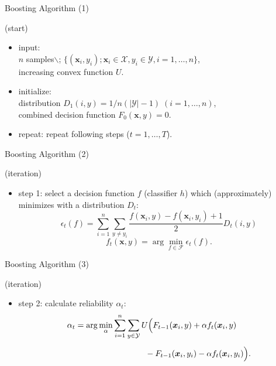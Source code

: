 \documentclass[fleqn,aspectratio=1610]{beamer}
\begin{document}
\begin{frame}[label={sec:org0817b00}]{Boosting Algorithm (1)}
\begin{block}{(start)}
\begin{itemize}
\item \alert{input:}\\[0pt]
\(n\) samples$\backslash$;
\(\{(\boldsymbol{x}_i,y_i); \boldsymbol{x}_i\in\mathcal{X},y_i\in\mathcal{Y}, i=1,\dots,n\}\),\\[0pt]
increasing convex function \(U\).
\item \alert{initialize:}\\[0pt]
distribution \(D_1(i,y)=1/n(|\mathcal{Y}|-1)\;(i=1,\dots,n)\),\\[0pt]
combined decision function \(F_0(\boldsymbol{x},y)=0\).
\item \alert{repeat:}
repeat following steps (\(t=1,\dots,T\)).
\end{itemize}
\end{block}
\end{frame}

\begin{frame}[label={sec:org96e89a5}]{Boosting Algorithm (2)}
\begin{block}{(iteration)}
\begin{itemize}
\item \alert{step 1:}
select a decision function \(f\) (classifier \(h\)) 
which (approximately) minimizes 
with a distribution \(D_t\):
\begin{equation}
  \epsilon_t(f) 
  =\sum_{i=1}^{n}\sum_{y\not=y_i}
  \frac{f(\boldsymbol{x}_i,y)-f(\boldsymbol{x}_i,y_i)+1}{2} D_t(i,y)
\end{equation}
\begin{equation}
  f_t(\boldsymbol{x},y)
  =\arg\min_{f\in\mathcal{F}}\epsilon_t(f).
\end{equation}
\end{itemize}
\end{block}
\end{frame}
\begin{frame}[label={sec:org6429079}]{Boosting Algorithm (3)}
\begin{block}{(iteration)}
\begin{itemize}
\item \alert{step 2:}
calculate reliability \(\alpha_t\):
\begin{align}
  \alpha_t 
  &=\arg\min_{\alpha}\sum_{i=1}^n\sum_{y\in\mathcal{Y}}
    U\Bigl(F_{t-1}(\boldsymbol{x}_i,y)
    +\alpha f_{t}(\boldsymbol{x}_i,y)\\
  &\phantom{\arg\min_{\alpha}\sum_{i=1}^n
    \sum_{y\in\mathcal{Y}}U}\quad
    -F_{t-1}(\boldsymbol{x}_i,y_i)
    -\alpha f_{t}(\boldsymbol{x}_i,y_i)\Bigr).
\end{align}
\end{itemize}
\end{block}
\end{frame}
\end{document}
